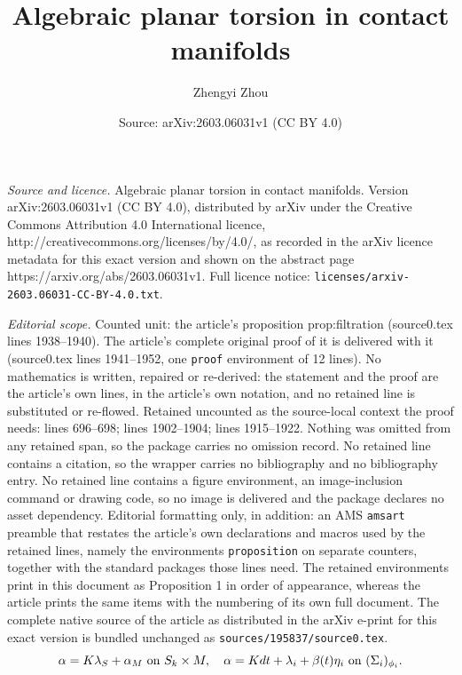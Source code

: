 \documentclass[10pt,a4paper]{amsart}
\title{Algebraic planar torsion in contact manifolds}
\author{Zhengyi Zhou}
\date{Source: arXiv:2603.06031v1 (CC BY 4.0)}
\def\rd{{\rm d}}
\begin{document}
\maketitle

\noindent\emph{Source and licence.} Algebraic planar torsion in contact manifolds. Version arXiv:2603.06031v1 (CC BY 4.0), distributed by arXiv under the Creative Commons Attribution 4.0 International licence, http://creativecommons.org/licenses/by/4.0/, as recorded in the arXiv licence metadata for this exact version and shown on the abstract page https://arxiv.org/abs/2603.06031v1. Full licence notice: \texttt{licenses/arxiv-2603.06031-CC-BY-4.0.txt}.\par\smallskip

\noindent\textit{Editorial scope.} Counted unit: the article's proposition prop:filtration (source0.tex lines 1938--1940). The article's complete original proof of it is delivered with it (source0.tex lines 1941--1952, one \texttt{proof} environment of 12 lines). No mathematics is written, repaired or re-derived: the statement and the proof are the article's own lines, in the article's own notation, and no retained line is substituted or re-flowed.  Retained uncounted as the source-local context the proof needs: lines 696--698; lines 1902--1904; lines 1915--1922.  Nothing was omitted from any retained span, so the package carries no omission record.  No retained line contains a citation, so the wrapper carries no bibliography and no bibliography entry.  No retained line contains a figure environment, an image-inclusion command or drawing code, so no image is delivered and the package declares no asset dependency.  Editorial formatting only, in addition: an AMS \texttt{amsart} preamble that restates the article's own declarations and macros used by the retained lines, namely the environments \texttt{proposition} on separate counters, together with the standard packages those lines need.  The retained environments print in this document as Proposition 1 in order of appearance, whereas the article prints the same items with the numbering of its own full document.  The complete native source of the article as distributed in the arXiv e-print for this exact version is bundled unchanged as \texttt{sources/195837/source0.tex}.
\begin{equation}\label{eqn:TW}
    \alpha = K\lambda_S+\alpha_M \text{ on } S_{k}\times M, \quad \alpha = K\rd t + \lambda_{i}+\beta(t)\eta_{i} \text{ on } (\Sigma_i)_{\phi_i}.
\end{equation}
\end{document}
